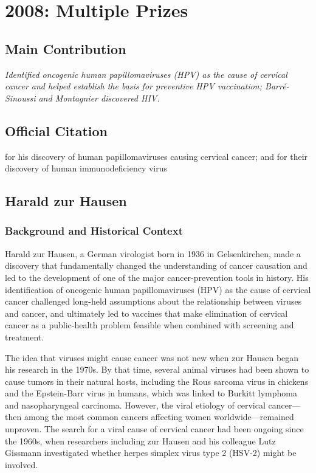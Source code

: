 \chapter[2008 --- Prizes]{2008: Multiple Prizes}
\label{ch:2008_Hausen}

\section*{Main Contribution}

\textit{Identified oncogenic human papillomaviruses (HPV) as the cause of cervical cancer and helped establish the basis for preventive HPV vaccination; Barr\'e-Sinoussi and Montagnier discovered HIV.}\cite{nobel-2008,lecture-2008}

\section{Official Citation}

for his discovery of human papillomaviruses causing cervical cancer; and for their discovery of human immunodeficiency virus

\section{Harald zur Hausen}

\subsection{Background and Historical Context}

Harald zur Hausen, a German virologist born in 1936 in Gelsenkirchen, made a discovery that fundamentally changed the understanding of cancer causation and led to the development of one of the major cancer-prevention tools in history. His identification of oncogenic human papillomaviruses (HPV) as the cause of cervical cancer challenged long-held assumptions about the relationship between viruses and cancer, and ultimately led to vaccines that make elimination of cervical cancer as a public-health problem feasible when combined with screening and treatment.

The idea that viruses might cause cancer was not new when zur Hausen began his research in the 1970s. By that time, several animal viruses had been shown to cause tumors in their natural hosts, including the Rous sarcoma virus in chickens and the Epstein-Barr virus in humans, which was linked to Burkitt lymphoma and nasopharyngeal carcinoma. However, the viral etiology of cervical cancer---then among the most common cancers affecting women worldwide---remained unproven. The search for a viral cause of cervical cancer had been ongoing since the 1960s, when researchers including zur Hausen and his colleague Lutz Gissmann investigated whether herpes simplex virus type 2 (HSV-2) might be involved.

